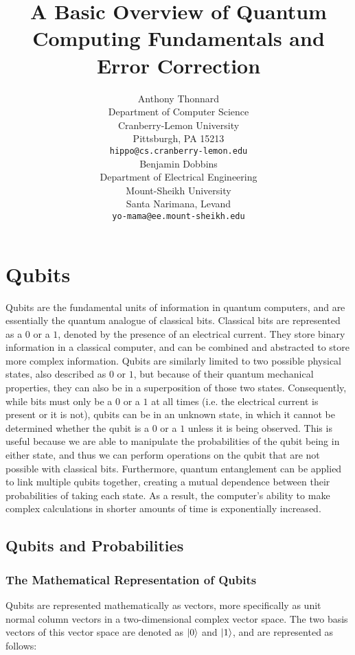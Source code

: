 \documentclass{article}
\title{A Basic Overview of Quantum Computing Fundamentals and Error Correction}
\author{Anthony Thonnard \\
	Department of Computer Science\\
	Cranberry-Lemon University\\
	Pittsburgh, PA 15213 \\
	\texttt{hippo@cs.cranberry-lemon.edu} \\
	\And
	Benjamin Dobbins \\
	Department of Electrical Engineering\\
	Mount-Sheikh University\\
	Santa Narimana, Levand \\
	\texttt{yo-mama@ee.mount-sheikh.edu} \\
}
\begin{document}
\maketitle
\begin{abstract}
	\lipsum[1]
\end{abstract}



\twocolumn[]
\section{Qubits}
\label{sec:qubits}
Qubits are the fundamental units of information in quantum computers, and are essentially the quantum analogue of classical bits. Classical bits are represented as a $0$ or 
a $1$, denoted by the presence of an electrical current. They store binary information in a classical computer, and can be combined and abstracted to store more complex 
information. Qubits are similarly limited to two possible physical states, also described as $0$ or $1$, but because of their quantum mechanical properties, they can also be 
in a superposition of those two states. Consequently, while bits must only be a $0$ or a $1$ at all times (i.e. the electrical current is present or it is not), qubits 
can be in an unknown state, in which it cannot be determined whether the qubit is a $0$ or a $1$ unless it is being observed. This is useful because we are able to manipulate 
the probabilities of the qubit being in either state, and thus we can perform operations on the qubit that are not possible with classical bits. Furthermore, 
quantum entanglement can be applied to link multiple qubits together, creating a mutual dependence between their probabilities of taking each state. As a result, the computer's
ability to make complex calculations in shorter amounts of time is exponentially increased.

\subsection{Qubits and Probabilities}
\label{sec:qubitprobs}


\subsubsection{The Mathematical Representation of Qubits}
\label{sec:mathrep}
Qubits are represented mathematically as vectors, more specifically as unit normal column vectors in a two-dimensional complex vector space. The two basis vectors of this 
vector space are denoted as $\ket{0}$ and $\ket{1}$, and are represented as follows: 
\end{document}
